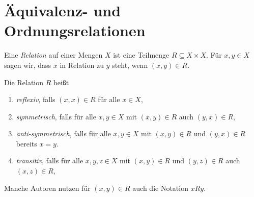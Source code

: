 \chapter{Äquivalenz- und Ordnungsrelationen}

\begin{defi}
 Eine \emph{Relation} auf einer Mengen $X$ ist eine Teilmenge $R \subseteq X \times X$. Für $x,y \in X$ sagen wir, dass $x$ in Relation zu $y$ steht, wenn $(x,y) \in R$.
 
 Die Relation $R$ heißt
 \begin{enumerate}[label=\roman*)]
  \item
   \emph{reflexiv}, falls $(x,x) \in R$ für alle $x \in X$,
  \item
   \emph{symmetrisch}, falls für alle $x,y \in X$ mit $(x,y) \in R$ auch $(y,x) \in R$,
  \item
   \emph{anti-symmetrisch}, falls für alle $x,y \in X$ mit $(x,y) \in R$ und $(y,x) \in R$ bereits $x=y$.
  \item
   \emph{transitiv}, falls für alle $x,y,z \in X$ mit $(x,y) \in R$ und $(y,z) \in R$ auch $(x,z) \in R$,
 \end{enumerate}
\end{defi}

\begin{bem}
 Manche Autoren nutzen für $(x,y) \in R$ auch die Notation $xRy$.
\end{bem}


